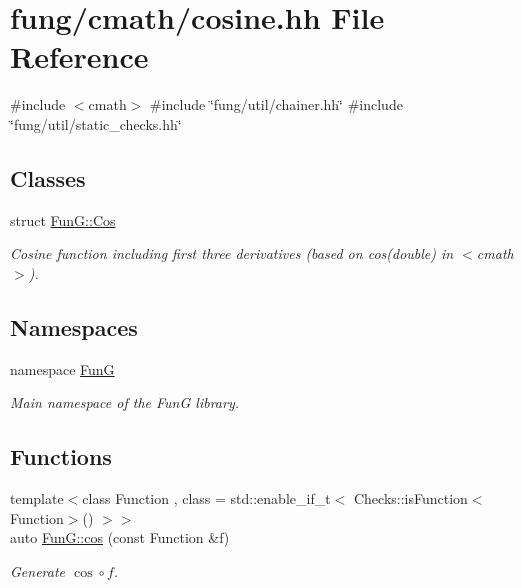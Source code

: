 \hypertarget{cosine_8hh}{\section{fung/cmath/cosine.hh \-File \-Reference}
\label{cosine_8hh}
}
{\ttfamily \#include $<$cmath$>$}\*
{\ttfamily \#include \char`\"{}fung/util/chainer.\-hh\char`\"{}}\*
{\ttfamily \#include \char`\"{}fung/util/static\-\_\-checks.\-hh\char`\"{}}\*
\subsection*{\-Classes}
\begin{DoxyCompactItemize}
\item 
struct \hyperlink{structFunG_1_1Cos}{\-Fun\-G\-::\-Cos}
\begin{DoxyCompactList}\small\item\em \-Cosine function including first three derivatives (based on cos(double) in $<$cmath$>$). \end{DoxyCompactList}\end{DoxyCompactItemize}
\subsection*{\-Namespaces}
\begin{DoxyCompactItemize}
\item 
namespace \hyperlink{namespaceFunG}{\-Fun\-G}
\begin{DoxyCompactList}\small\item\em \-Main namespace of the \-Fun\-G library. \end{DoxyCompactList}\end{DoxyCompactItemize}
\subsection*{\-Functions}
\begin{DoxyCompactItemize}
\item 
{\footnotesize template$<$class Function , class  = std\-::enable\-\_\-if\-\_\-t$<$ Checks\-::is\-Function$<$\-Function$>$() $>$$>$ }\\auto \hyperlink{group__CMathGroup_ga7e9b2ac717cd2350663293cb66ba6cbd}{\-Fun\-G\-::cos} (const \-Function \&f)
\begin{DoxyCompactList}\small\item\em \-Generate $ \cos\circ f $. \end{DoxyCompactList}\end{DoxyCompactItemize}
